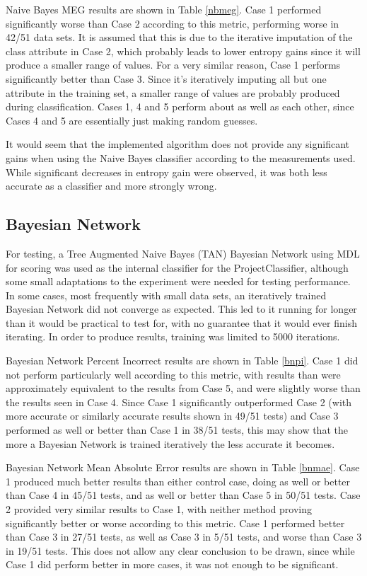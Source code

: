 Naive Bayes MEG results are shown in Table \ref{nbmeg}. Case 1 performed significantly worse than Case 2 according to this metric, performing worse in 42/51 data sets. It is assumed that this is due to the iterative imputation of the class attribute in Case 2, which probably leads to lower entropy gains since it will produce a smaller range of values. For a very similar reason, Case 1 performs significantly better than Case 3. Since it's iteratively imputing all but one attribute in the training set, a smaller range of values are probably produced during classification. Cases 1, 4 and 5 perform about as well as each other, since Cases 4 and 5 are essentially just making random guesses.

It would seem that the implemented algorithm does not provide any significant gains when using the Naive Bayes classifier according to the measurements used. While significant decreases in entropy gain were observed, it was both less accurate as a classifier and more strongly wrong.

\subsection{Bayesian Network}
For testing, a Tree Augmented Naive Bayes (TAN) Bayesian Network using MDL for scoring was used as the internal classifier for the ProjectClassifier, although some small adaptations to the experiment were needed for testing performance. In some cases, most frequently with small data sets, an iteratively trained Bayesian Network did not converge as expected. This led to it running for longer than it would be practical to test for, with no guarantee that it would ever finish iterating. In order to produce results, training was limited to 5000 iterations.

Bayesian Network Percent Incorrect results are shown in Table \ref{bnpi}. Case 1 did not perform particularly well according to this metric, with results than were approximately equivalent to the results from Case 5, and were slightly worse than the results seen in Case 4. Since Case 1 significantly outperformed Case 2 (with more accurate or similarly accurate results shown in 49/51 tests) and Case 3 performed as well or better than Case 1 in 38/51 tests, this may show that the more a Bayesian Network is trained iteratively the less accurate it becomes. 

Bayesian Network Mean Absolute Error results are shown in Table \ref{bnmae}. Case 1 produced much better results than either control case, doing as well or better than Case 4 in 45/51 tests, and as well or better than Case 5 in 50/51 tests. Case 2 provided very similar results to Case 1, with neither method proving significantly better or worse according to this metric. Case 1 performed better than Case 3 in 27/51 tests, as well as Case 3 in 5/51 tests, and worse than Case 3 in 19/51 tests. This does not allow any clear conclusion to be drawn, since while Case 1 did perform better in more cases, it was not enough to be significant.

